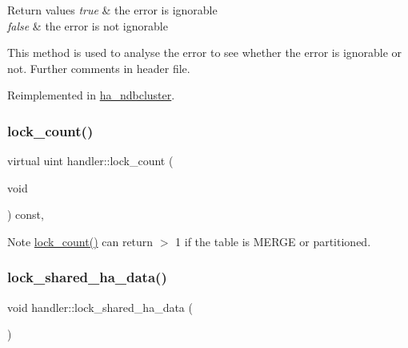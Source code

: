 \begin{DoxyRetVals}{Return values}
{\em true} & the error is ignorable \\
\hline
{\em false} & the error is not ignorable\\
\hline
\end{DoxyRetVals}
This method is used to analyse the error to see whether the error is ignorable or not. Further comments in header file. 

Reimplemented in \mbox{\hyperlink{classha__ndbcluster_a95efd97175c4d0f4e5548473b6759e31}{ha\+\_\+ndbcluster}}.

\mbox{\label{classhandler_a2447668275a831bcf73b5c00818254a6}} 
\subsubsection{\texorpdfstring{lock\+\_\+count()}{lock\_count()}}
{\footnotesize\ttfamily virtual uint handler\+::lock\+\_\+count (\begin{DoxyParamCaption}\item[{void}]{ }\end{DoxyParamCaption}) const\hspace{0.3cm}{\ttfamily [inline]}, {\ttfamily [virtual]}}

\begin{DoxyNote}{Note}
\mbox{\hyperlink{classhandler_a2447668275a831bcf73b5c00818254a6}{lock\+\_\+count()}} can return $>$ 1 if the table is M\+E\+R\+GE or partitioned. 
\end{DoxyNote}
\mbox{\label{classhandler_aa3a39db9dc1cca31f4a3ec0e0e1d7300}} 
\subsubsection{\texorpdfstring{lock\+\_\+shared\+\_\+ha\+\_\+data()}{lock\_shared\_ha\_data()}}
{\footnotesize\ttfamily void handler\+::lock\+\_\+shared\+\_\+ha\+\_\+data (\begin{DoxyParamCaption}{ }\end{DoxyParamCaption})\hspace{0.3cm}{\ttfamily [protected]}}

